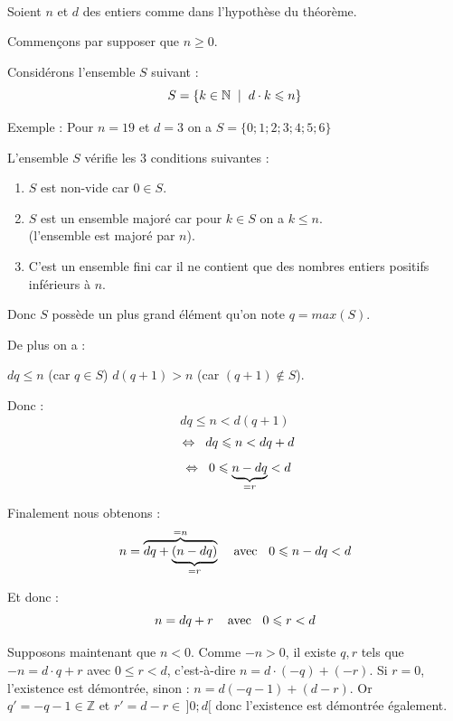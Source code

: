 \begin{demonstration}
~
\centerline{}

\bigskip
Soient $n$ et $d$ des entiers comme dans l'hypothèse du théorème.

\smallskip
Commençons par supposer que $n\geqslant 0$.

\bigskip
Considérons l'ensemble $S$ suivant :
$$S=\lbrace k\in \N \eh{2}\vert\eh{2} d\cdot k \leqslant n\rbrace$$

{Exemple : Pour $n=19$ et $d=3$ on a $S=\lbrace 0; 1; 2; 3; 4; 5; 6\rbrace$ }

\medskip
L'ensemble $S$ vérifie les 3 conditions suivantes :
\begin{enumerate}[label=\textbf{\roman*)}]
\item $S$ est non-vide car $0\in S$.
\item $S$ est un ensemble majoré car pour $k\in S$ on a $k\leqslant n$.\\
(l'ensemble est majoré par $n$).
\item C'est un ensemble fini car il ne contient que des nombres entiers positifs inférieurs à $n$.
\end{enumerate}

Donc $S$ possède un plus grand élément qu'on note $q=max(S)$.

\medskip

De plus on a : \hspace{2mm}\begin{minipage}[t]{0.8\textwidth}$d q \leqslant n$ (car $q\in S$)  $d (q+1)>n$ (car $(q+1)\notin S$).\end{minipage}

\smallskip
Donc : $$d q \leqslant n < d (q+1)$$
$$\ssi[2]d q \leqslant n < d q+d $$
$$\ssi[2]0\leqslant \underbrace{n-dq}_{=r}<d$$

Finalement nous obtenons : 
$$n=\overbrace{d q+\underbrace{(n-dq)}_{=r}}^{=n}\eh{4}\textrm{avec }\eh{2} 0\leqslant n-dq<d$$

Et donc :
$$n=d q+r\eh{4}\textrm{avec }\eh{2} 0\leqslant r<d$$

Supposons maintenant que $n<0$. Comme $-n>0$, il existe $q,r$ tels que
$-n=d\cdot q+r$ avec $0\leqslant r<d$, c'est-à-dire $n = d\cdot (-q)+(-r)$. Si $r=0$, l'existence est démontrée, sinon :
$n= d(-q-1)+(d-r)$. Or $q'=-q-1\in \mathbb{Z}$ et $r'=d-r \in \,]0;d[$ donc l'existence est démontrée également.


\end{demonstration}
